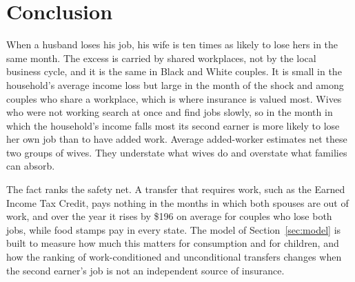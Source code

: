 \section{Conclusion}\label{sec:conclusion}

When a husband loses his job, his wife is ten times as likely to lose hers in the same month. The excess is carried by
shared workplaces, not by the local business cycle, and it is the same in Black and White couples. It is small in the
household's average income loss but large in the month of the shock and among couples who share a workplace, which is
where insurance is valued most. Wives who were not working search at once and find jobs slowly, so in the month in which
the household's income falls most its second earner is more likely to lose her own job than to have added work. Average
added-worker estimates net these two groups of wives. They understate what wives do and overstate what families can
absorb.

The fact ranks the safety net. A transfer that requires work, such as the Earned Income Tax Credit, pays nothing in the
months in which both spouses are out of work, and over the year it rises by \$196 on average for couples who lose
both jobs, while food stamps pay in every state. The model of
Section~\ref{sec:model} is built to measure how much this matters for consumption and for children, and how the
ranking of work-conditioned and unconditional transfers changes when the second earner's job is not an independent
source of insurance.
